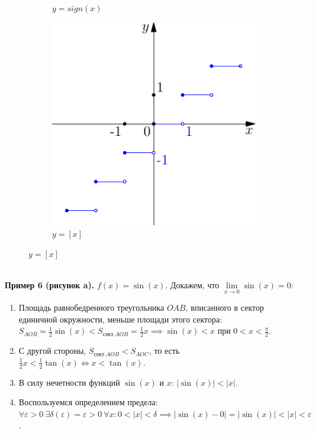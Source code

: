 \documentclass{article}
\begin{document}
\begin{figure}[h]
\begin{subfigure}[t]{0.3\textwidth}
            \caption{\(y = sign(x)\)}
        \end{subfigure}
        \hfill
        \begin{subfigure}[t]{0.3\textwidth}
            \includegraphics{4-3.pdf}
            \caption{\(y = [x]\)}
        \end{subfigure}
    \end{figure}\\
    \textbf{Пример 6 (рисунок a).} \(f(x) = \sin(x)\). Докажем, что \(\displaystyle \lim\limits_{x \to 0}\sin(x) = 0\):
    \begin{enumerate}
        \item Площадь равнобедренного треугольника \(OAB\), вписанного в сектор единичной окружности, меньше площади этого сектора: 
        \(\displaystyle S_{AOB} = \frac{1}{2}\sin(x) < S_{\text{сект.} AOB} = \frac{1}{2}x \implies \sin(x) < x\) при \(\displaystyle 0 < x < \frac{\pi}{2}\).
        \item С другой стороны, \(\displaystyle S_{\text{сект.} AOB} < S_{AOC}\), то есть \(\displaystyle \frac{1}{2}x < \frac{1}{2} \tan(x) \iff x < \tan(x)\).
        \item В силу нечетности функций \(\sin(x)\) и \(x\): \(|\sin(x)| < |x|\).
        \item Воспользуемся определением предела: \(\displaystyle \forall \varepsilon > 0\ \exists \delta(\varepsilon) = \varepsilon > 0\ \forall x: 0 < |x| < \delta \implies |\sin(x) - 0| = |\sin(x)| < |x| < \varepsilon\).
    \end{enumerate}       
\end{document}
